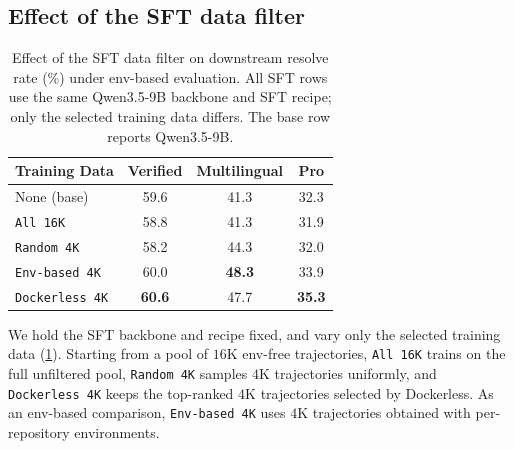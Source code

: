 \documentclass{llmxive}
\providecommand{\approach}{Dockerless\xspace}
\begin{document}


\subsection{Effect of the SFT data filter}
\label{sec:sft-filter}
\begin{table}[t]
\centering
\small
\begin{tabular}{lccc}
\toprule
\textbf{Training Data}
& \textbf{Verified}
& \textbf{Multilingual}
& \textbf{Pro} \\
\midrule
None (base) & 59.6 & 41.3 & 32.3 \\
\texttt{All 16K}         & 58.8 & 41.3 & 31.9 \\
\midrule
\texttt{Random 4K}       & 58.2 & 44.3 & 32.0 \\
\texttt{Env-based 4K}    & 60.0 & \textbf{48.3} & 33.9 \\
\rowcolor{black!4} \texttt{\approach 4K} & \textbf{60.6} & 47.7 & \textbf{35.3} \\
\bottomrule
\end{tabular}%
\caption{
Effect of the SFT data filter on downstream resolve rate (\%) under env-based evaluation.
All SFT rows use the same Qwen3.5-9B backbone and SFT recipe; only the selected training data differs.
The base row reports Qwen3.5-9B.
}
\label{tab:sft-same-scale}
\end{table}

We hold the SFT backbone and recipe fixed, and vary only the selected training data (\cref{tab:sft-same-scale}).
Starting from a pool of $16$K env-free trajectories, \texttt{All 16K} trains on the full unfiltered pool, \texttt{Random 4K} samples $4$K trajectories uniformly, and \texttt{\approach 4K} keeps the top-ranked $4$K trajectories selected by \approach.
As an env-based comparison, \texttt{Env-based 4K} uses $4$K trajectories obtained with per-repository environments.
\end{document}
